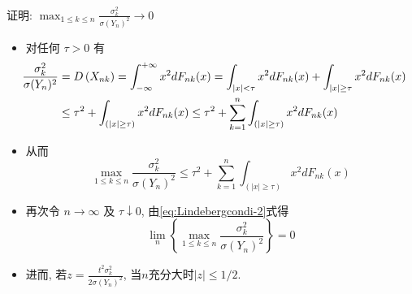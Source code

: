 \begin{frame}{证明: $\max _{1 \leq k \leq n} \frac{\sigma_{k}^{2}}{\sigma(Y_n)^2}\rightarrow 0$}
	\vspace{-0.1cm}
\begin{itemize}
	\item 对任何 $\tau>0$ 有
\begin{align*}
	\hspace{-0.4cm}\frac{\sigma_{k}^{2}}{\sigma(Y_n)^2}&=D\left(X_{n k}\right)=\int_{-\infty}^{+\infty}x^2dF_{nk}(x)=\int_{|x|<\tau}x^2dF_{nk}(x)+\int_{|x|\geq\tau}x^2dF_{nk}(x)\\
	&\leq \tau^{2}+\int_{(|x| \geq \tau)} x^{2} d F_{n k}(x)\leq \tau^{2}+\sum_{k=1}^{n} \int_{(|x| \geq \tau)} x^{2} d F_{n k}(x)
\end{align*}
\item 从而
	\[
	\max _{1 \leq k \leq n} \frac{\sigma_{k}^{2}}{\sigma(Y_n)^2} \leq \tau^{2}+\sum_{k=1}^{n} \int_{(|x| \geq \tau)} x^{2} d F_{n k}(x)
	\]
\item
	再次令 $n \rightarrow \infty$ 及 $\tau \downarrow 0$, 由\eqref{eq:Lindebergcondi-2}式得
	\[
	\lim _{n}\left\{\max _{1 \leq k \leq n} \frac{\sigma_{k}^{2}}{\sigma(Y_n)^2}\right\}=0
	\]
	\item 进而, 若$z=\frac{t^{2} \sigma_{k}^{2}}{2 \sigma(Y_n)^2}$, 当$n$充分大时$|z| \leq 1 / 2$.
\end{itemize}

\end{frame}









